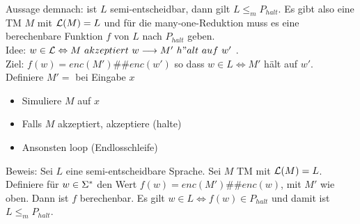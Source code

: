     \LOES Aussage demnach: ist $L$ semi-entscheidbar, dann gilt $L \leq_{m} P_{halt}$. Es gibt also eine TM $M$ mit $\mathcal{L}(M) = L$ und für die many-one-Reduktion muss es eine berechenbare Funktion $f$ von $L$ nach $P_{halt}$ geben. \\

    Idee: $w \in \LANG \Leftrightarrow M\ akzeptiert\ w \longrightarrow M'\ h"alt\ auf\ w'$ . \\
    Ziel: $f(w) = enc(M')\#\#enc(w')$ so dass $w \in L \Leftrightarrow M'$ hält auf $w'$. \\
    Definiere $M' =$ bei Eingabe $x$
    \begin{itemize}
        \item Simuliere $M$ auf $x$
        \item Falls $M$ akzeptiert, akzeptiere (halte)
        \item Ansonsten loop (Endlosschleife)
    \end{itemize}

    Beweis: Sei $L$ eine semi-entscheidbare Sprache. Sei $M$ TM mit $\mathcal{L}(M) = L$. Definiere für $w \in \Sigma^{*}$ den Wert $f(w) = enc(M')\#\#enc(w)$, mit $M'$ wie oben.
    Dann ist $f$ berechenbar. Es gilt $w \in L \Leftrightarrow f(w) \in P_{halt}$ und damit ist $L \leq_{m} P_{halt}$.
